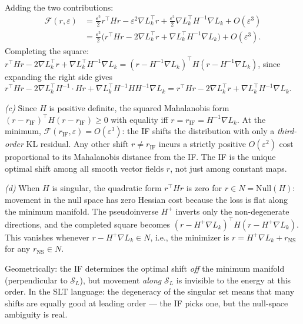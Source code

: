 \begin{solution}[ex:bif-ot]
Adding the two contributions:
\begin{align*}
  \mathcal{F}(r,\varepsilon) &= \frac{\varepsilon^2}{2}r^\top Hr - \varepsilon^2\nabla L_k^\top r + \frac{\varepsilon^2}{2}\nabla L_k^\top H^{-1}\nabla L_k + O(\varepsilon^3) \\
  &= \frac{\varepsilon^2}{2}\bigl(r^\top Hr - 2\nabla L_k^\top r + \nabla L_k^\top H^{-1}\nabla L_k\bigr) + O(\varepsilon^3).
\end{align*}
Completing the square: $r^\top Hr - 2\nabla L_k^\top r + \nabla L_k^\top H^{-1}\nabla L_k = (r - H^{-1}\nabla L_k)^\top H(r - H^{-1}\nabla L_k)$, since expanding the right side gives $r^\top Hr - 2\nabla L_k^\top H^{-1}\cdot Hr + \nabla L_k^\top H^{-1}HH^{-1}\nabla L_k = r^\top Hr - 2\nabla L_k^\top r + \nabla L_k^\top H^{-1}\nabla L_k$.

\textit{(c)} Since $H$ is positive definite, the squared Mahalanobis form $(r-r_{\mathrm{IF}})^\top H(r-r_{\mathrm{IF}}) \ge 0$ with equality iff $r = r_{\mathrm{IF}} = H^{-1}\nabla L_k$. At the minimum, $\mathcal{F}(r_{\mathrm{IF}},\varepsilon) = O(\varepsilon^3)$: the IF shifts the distribution with only a \emph{third-order} KL residual. Any other shift $r\ne r_{\mathrm{IF}}$ incurs a strictly positive $O(\varepsilon^2)$ cost proportional to its Mahalanobis distance from the IF. The IF is the unique optimal shift among all smooth vector fields $r$, not just among constant maps.

\textit{(d)} When $H$ is singular, the quadratic form $r^\top Hr$ is zero for $r\in N = \mathrm{Null}(H)$: movement in the null space has zero Hessian cost because the loss is flat along the minimum manifold. The pseudoinverse $H^+$ inverts only the non-degenerate directions, and the completed square becomes $(r - H^+\nabla L_k)^\top H(r - H^+\nabla L_k)$. This vanishes whenever $r - H^+\nabla L_k \in N$, i.e., the minimizer is $r = H^+\nabla L_k + r_{\mathrm{NS}}$ for any $r_{\mathrm{NS}}\in N$.

Geometrically: the IF determines the optimal shift \emph{off} the minimum manifold (perpendicular to $\mathcal{S}_L$), but movement \emph{along} $\mathcal{S}_L$ is invisible to the energy at this order. In the SLT language: the degeneracy of the singular set means that many shifts are equally good at leading order --- the IF picks one, but the null-space ambiguity is real.


\end{solution}
